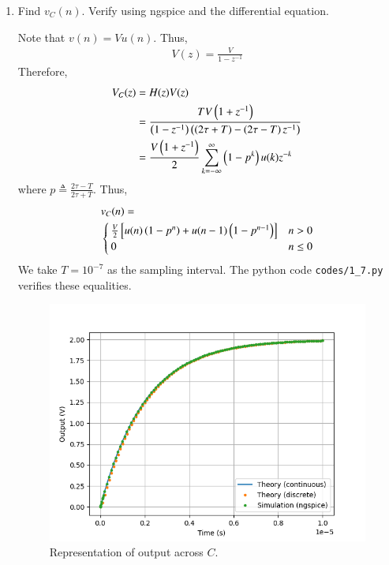 \documentclass[journal,12pt,twocolumn]{IEEEtran}
\renewcommand\thesection{\arabic{section}}
\begin{document}
\begin{enumerate}[label=\arabic*.,ref=\thesection.\theenumi]
\item Find $v_C(n)$. Verify using ngspice and the differential equation.

\solution Note that $v(n) = Vu(n)$. Thus,
\begin{align}
    V(z) = \frac{V}{1-z^{-1}}
\end{align}
Therefore,
\begin{align}
    V_C(z) &= H(z)V(z) \\
         &= \frac{TV\left(1+z^{-1}\right)}{\left(1-z^{-1}\right)\left(\left(2\tau+T\right)-\left(2\tau-T\right)z^{-1}\right)} \\
         &= \frac{V\left(1+z^{-1}\right)}{2}\sum_{k=-\infty}^{\infty}\left(1-p^k\right)u(k)z^{-k}
\end{align}
where $p \triangleq \frac{2\tau-T}{2\tau+T}$. Thus,
\begin{align}
    &v_C(n) = \nonumber \\
    &\begin{cases}
        \frac{V}{2}\sbrak{u(n)\brak{1-p^n}+u(n-1)\brak{1-p^{n-1}}} & n > 0 \\
        0 & n \le 0
    \end{cases}
    \label{eq:cktsig/bilinear/vn}
\end{align}
We take $T = 10^{-7}$ as the
sampling interval. The python code \texttt{codes/1\_7.py} verifies
these equalities.
\begin{figure}
    \includegraphics[width=\columnwidth]{cktsig/figs/1_7.png}
    \caption{Representation of output across $C$.}
    \label{fig:cktsig/bilinear/vc}
\end{figure}
\end{enumerate}
\iffalse
\end{document}
